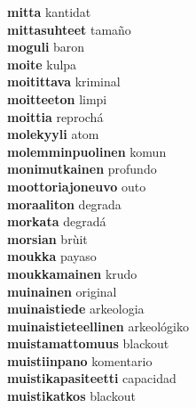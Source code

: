 \textbf{mitta } kantidat \\
\textbf{mittasuhteet } tamaño \\
\textbf{moguli } baron \\
\textbf{moite } kulpa \\
\textbf{moitittava } kriminal \\
\textbf{moitteeton } limpi \\
\textbf{moittia } reprochá \\
\textbf{molekyyli } atom \\
\textbf{molemminpuolinen } komun \\
\textbf{monimutkainen } profundo \\
\textbf{moottoriajoneuvo } outo \\
\textbf{moraaliton } degrada \\
\textbf{morkata } degradá \\
\textbf{morsian } brùit \\
\textbf{moukka } payaso \\
\textbf{moukkamainen } krudo \\
\textbf{muinainen } original \\
\textbf{muinaistiede } arkeologia \\
\textbf{muinaistieteellinen } arkeológiko \\
\textbf{muistamattomuus } blackout \\
\textbf{muistiinpano } komentario \\
\textbf{muistikapasiteetti } capacidad \\
\textbf{muistikatkos } blackout \\
